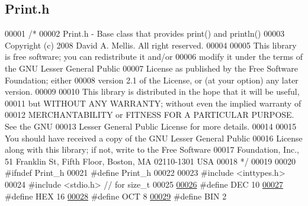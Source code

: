 \hypertarget{_print_8h_source}{
\subsection{Print.h}
}

\begin{DoxyCode}
00001 \textcolor{comment}{/*}
00002 \textcolor{comment}{  Print.h - Base class that provides print() and println()}
00003 \textcolor{comment}{  Copyright (c) 2008 David A. Mellis.  All right reserved.}
00004 \textcolor{comment}{}
00005 \textcolor{comment}{  This library is free software; you can redistribute it and/or}
00006 \textcolor{comment}{  modify it under the terms of the GNU Lesser General Public}
00007 \textcolor{comment}{  License as published by the Free Software Foundation; either}
00008 \textcolor{comment}{  version 2.1 of the License, or (at your option) any later version.}
00009 \textcolor{comment}{}
00010 \textcolor{comment}{  This library is distributed in the hope that it will be useful,}
00011 \textcolor{comment}{  but WITHOUT ANY WARRANTY; without even the implied warranty of}
00012 \textcolor{comment}{  MERCHANTABILITY or FITNESS FOR A PARTICULAR PURPOSE.  See the GNU}
00013 \textcolor{comment}{  Lesser General Public License for more details.}
00014 \textcolor{comment}{}
00015 \textcolor{comment}{  You should have received a copy of the GNU Lesser General Public}
00016 \textcolor{comment}{  License along with this library; if not, write to the Free Software}
00017 \textcolor{comment}{  Foundation, Inc., 51 Franklin St, Fifth Floor, Boston, MA  02110-1301  USA}
00018 \textcolor{comment}{*/}
00019 
00020 \textcolor{preprocessor}{#ifndef Print\_h}
00021 \textcolor{preprocessor}{}\textcolor{preprocessor}{#define Print\_h}
00022 \textcolor{preprocessor}{}
00023 \textcolor{preprocessor}{#include <inttypes.h>}
00024 \textcolor{preprocessor}{#include <stdio.h>} \textcolor{comment}{// for size\_t}
00025 
\hypertarget{_print_8h_source_l00026}{}\hyperlink{_print_8h_afe38ec6126e35e40049e27fdf4586ba5}{00026} \textcolor{preprocessor}{#define DEC 10}
\hypertarget{_print_8h_source_l00027}{}\hyperlink{_print_8h_a9075d93e0ab26ccd6e059fa06aa4e3de}{00027} \textcolor{preprocessor}{}\textcolor{preprocessor}{#define HEX 16}
\hypertarget{_print_8h_source_l00028}{}\hyperlink{_print_8h_a904777e8f3d21de0a6679d2c9f0f1eec}{00028} \textcolor{preprocessor}{}\textcolor{preprocessor}{#define OCT 8}
\hypertarget{_print_8h_source_l00029}{}\hyperlink{_print_8h_a75267cdfa3fa9e52c7c1f1094f9387b7}{00029} \textcolor{preprocessor}{}\textcolor{preprocessor}{#define BIN 2}

\end{DoxyCode}
